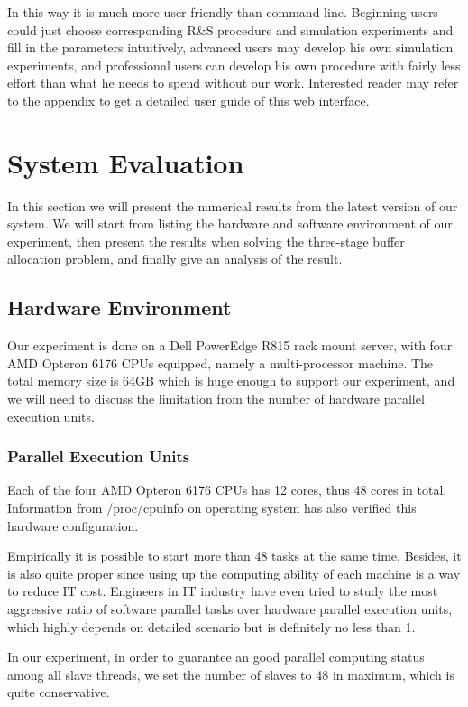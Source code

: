 In this way it is much more user friendly than command line. Beginning users could just choose corresponding R\&S procedure and simulation experiments and fill in the parameters intuitively, advanced users may develop his own simulation experiments, and professional users can develop his own procedure with fairly less effort than what he needs to spend without our work. Interested reader may refer to the appendix to get a detailed user guide of this web interface.

\section{System Evaluation}

In this section we will present the numerical results from the latest version of our system. We will start from listing the hardware and software environment of our experiment, then present the results when solving the three-stage buffer allocation problem, and finally give an analysis of the result.

\subsection{Hardware Environment}

Our experiment is done on a Dell PowerEdge R815 rack mount server, with four AMD Opteron 6176 CPUs equipped, namely a multi-processor machine. The total memory size is 64GB which is huge enough to support our experiment, and we will need to discuss the limitation from the number of hardware parallel execution units.

\subsubsection{Parallel Execution Units}

Each of the four AMD Opteron 6176 CPUs has 12 cores, thus 48 cores in total. Information from /proc/cpuinfo on operating system has also verified this hardware configuration.

Empirically it is possible to start more than 48 tasks at the same time. Besides, it is also quite proper since using up the computing ability of each machine is a way to reduce IT cost. Engineers in IT industry have even tried to study the most aggressive ratio of software parallel tasks over hardware parallel execution units, which highly depends on detailed scenario but is definitely no less than 1.

In our experiment, in order to guarantee an good parallel computing status among all slave threads, we set the number of slaves to 48 in maximum, which is quite conservative.

